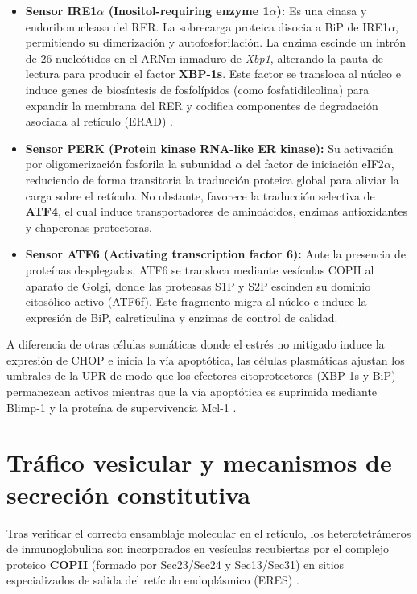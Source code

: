 \begin{itemize}
	\item \textbf{Sensor IRE1$\alpha$ (Inositol-requiring enzyme 1$\alpha$):} Es una cinasa y endoribonucleasa del RER. La sobrecarga proteica disocia a BiP de IRE1$\alpha$, permitiendo su dimerización y autofosforilación. La enzima escinde un intrón de 26 nucleótidos en el ARNm inmaduro de \emph{Xbp1}, alterando la pauta de lectura para producir el factor \textbf{XBP-1s}. Este factor se transloca al núcleo e induce genes de biosíntesis de fosfolípidos (como fosfatidilcolina) para expandir la membrana del RER y codifica componentes de degradación asociada al retículo (ERAD) \parencite{todd2009xbp1}.
	\item \textbf{Sensor PERK (Protein kinase RNA-like ER kinase):} Su activación por oligomerización fosforila la subunidad $\alpha$ del factor de iniciación eIF2$\alpha$, reduciendo de forma transitoria la traducción proteica global para aliviar la carga sobre el retículo. No obstante, favorece la traducción selectiva de \textbf{ATF4}, el cual induce transportadores de aminoácidos, enzimas antioxidantes y chaperonas protectoras.
	\item \textbf{Sensor ATF6 (Activating transcription factor 6):} Ante la presencia de proteínas desplegadas, ATF6 se transloca mediante vesículas COPII al aparato de Golgi, donde las proteasas S1P y S2P escinden su dominio citosólico activo (ATF6f). Este fragmento migra al núcleo e induce la expresión de BiP, calreticulina y enzimas de control de calidad.
\end{itemize}

A diferencia de otras células somáticas donde el estrés no mitigado induce la expresión de CHOP e inicia la vía apoptótica, las células plasmáticas ajustan los umbrales de la UPR de modo que los efectores citoprotectores (XBP-1s y BiP) permanezcan activos mientras que la vía apoptótica es suprimida mediante Blimp-1 y la proteína de supervivencia Mcl-1 \parencite{walter2011unfolded}.

\section{Tráfico vesicular y mecanismos de secreción constitutiva}

Tras verificar el correcto ensamblaje molecular en el retículo, los heterotetrámeros de inmunoglobulina son incorporados en vesículas recubiertas por el complejo proteico \textbf{COPII} (formado por Sec23/Sec24 y Sec13/Sec31) en sitios especializados de salida del retículo endoplásmico (ERES) \parencite{karp2020cell,alberts2022molecular}.

